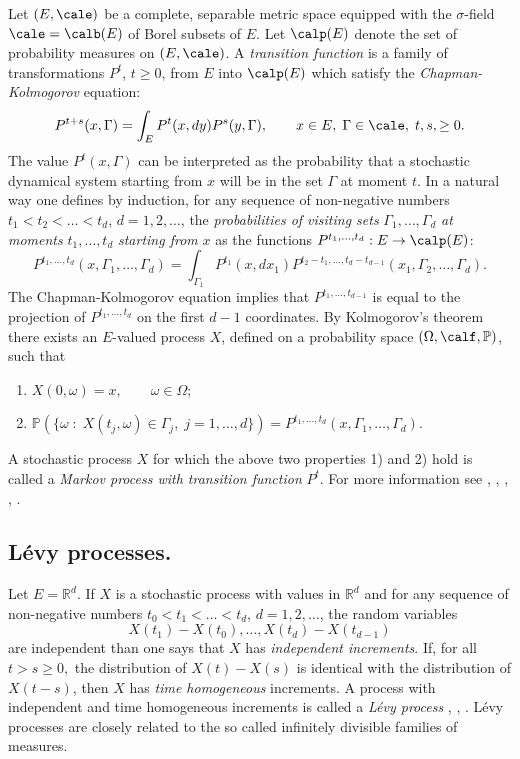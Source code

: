 \documentclass[preprint]{imsart}
\def\P{\mathbb P}
\def\R{\mathbb R}
\begin{document}
{Let $(E,\cale)$ be a complete, separable metric space equipped
with the $\sigma$-field $\cale=\calb (E)$ of Borel subsets of $E$.
Let $\calp (E)$ denote the set of probability measures on
$(E,\cale)$. A {\it transition function}  is a family of transformations
$P^t$, $t\geq 0$, from $E$ into $\calp (E)$ which satisfy the
{\it Chapman-Kolmogorov} equation:
$$
P^{t+s}(x,\Gamma)= \int_E P^{t}(x,dy)P^{s}(y,\Gamma),
\qquad x\in E,\; \Gamma\in \cale,\; t,s,\geq 0.
$$
The value $P^{t}(x,\Gamma)$ can be interpreted as the probability
that a stochastic dynamical system starting from $x$ will be in
the set $\Gamma$ at moment $t$. In a natural way one defines by
induction, for any sequence of non-negative numbers
 $t_1<t_2<\ldots<t_d$, $d=1,2,\ldots$, the {\em probabilities
 of visiting sets } $\Gamma_1,\ldots, \Gamma_d$ {\em at
 moments } $t_1,\ldots ,t_d$ {\em starting  from} $x$ as the
functions
$P^{t_1,\ldots ,t_d}:E\to \calp (E)$:
$$
P^{t_1,\ldots ,t_d}(x, \Gamma_1,\ldots, \Gamma_d)=
\int_{\Gamma_1}P^{t_1}(x, dx_1)
P^{t_2-t_1,\ldots ,t_d-t_{d-1}}(x_1, \Gamma_2,\ldots, \Gamma_d).
$$
The Chapman-Kolmogorov equation implies that
$P^{t_1,\ldots ,t_{d-1}}$  is equal to the projection of
$P^{t_1,\ldots ,t_d}$ on the first $d-1$ coordinates. By
Kolmogorov's theorem there exists an $E$-valued process $X$,
defined on a probability space $(\Omega,\calf,\P)$, such that
\begin{enumerate}
\item[1)] $X(0,\omega)=x,\qquad \omega\in\Omega$;
\item[2)] $\P(\{\omega\; :\; X(t_j,\omega)\in \Gamma_j,\;
j=1,\ldots, d\})= P^{t_1,\ldots ,t_d}(x, \Gamma_1,\ldots,
\Gamma_d)$.
\end{enumerate}
A stochastic process $X$ for which the above two properties 1) and 2) hold is called a {\it Markov process with
transition function} $P^t$. For more information see \cite{bib17}, \cite{Dy}, \cite{BG}, \cite{EK}, \cite{Sh}.

\subsection{L\'evy processes.}

\noindent Let $E=\R^d$. If $X$ is a stochastic process with values in $\R^d$ and for any sequence of non-negative
numbers $t_0<t_1<\ldots<t_d$, $d=1,2,\ldots$, the random
variables
$$
X(t_1)-X(t_0),\ldots ,X(t_d)-X(t_{d-1})
$$
are independent than one says that $X$ has {\it independent increments}. If, for all $t> s\geq 0,$
the distribution of $X(t) - X(s)$ is identical with the distribution of $X(t-s)$, then $X$ has {\it time
homogeneous} increments. A process with independent and time homogeneous increments is called a {\it L\'evy process}
\cite{bib11}, \cite{sato}, \cite{bertoin}.
L\'evy processes are closely related to the so called infinitely divisible families of measures.
\vspace{2mm}

}
\end{document}
